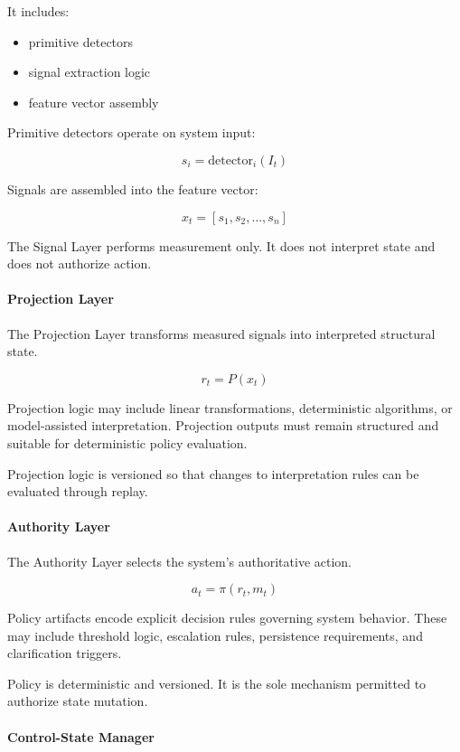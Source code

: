 \documentclass[11pt]{article}
\begin{document}
It includes:

\begin{itemize}
  \item primitive detectors
  \item signal extraction logic
  \item feature vector assembly
\end{itemize}

Primitive detectors operate on system input:

\[
s_i = \mathrm{detector}_i(I_t)
\]

Signals are assembled into the feature vector:

\[
x_t = [s_1, s_2, \dots, s_n]
\]

The Signal Layer performs measurement only. It does not interpret state and does not authorize action.

\paragraph{Projection Layer}

The Projection Layer transforms measured signals into interpreted structural state.

\[
r_t = P(x_t)
\]

Projection logic may include linear transformations, deterministic algorithms, or model-assisted interpretation. Projection outputs must remain structured and suitable for deterministic policy evaluation.

Projection logic is versioned so that changes to interpretation rules can be evaluated through replay.

\paragraph{Authority Layer}

The Authority Layer selects the system’s authoritative action.

\[
a_t = \pi(r_t, m_t)
\]

Policy artifacts encode explicit decision rules governing system behavior. These may include threshold logic, escalation rules, persistence requirements, and clarification triggers.

Policy is deterministic and versioned. It is the sole mechanism permitted to authorize state mutation.

\paragraph{Control-State Manager}
\end{document}
